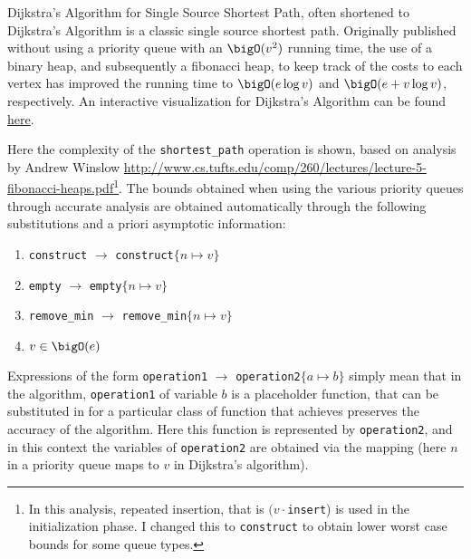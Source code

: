 Dijkstra's Algorithm for Single Source Shortest Path, often shortened to Dijkstra's Algorithm is a classic single source shortest path.  Originally published without using a priority queue with an $\bigO(v^2)$ running time, the use of a binary heap, and subsequently a fibonacci heap, to keep track of the costs to each vertex has improved the running time to $\bigO(e \log v)$ and $\bigO(e + v \log v)$, respectively.  An interactive visualization for Dijkstra's Algorithm can be found \href{http://www.cs.usfca.edu/~galles/visualization/Dijkstra.html}{here}.

\par
\bigskip

Here the complexity of the \texttt{shortest\_path} operation is shown, based on analysis by Andrew Winslow \url{http://www.cs.tufts.edu/comp/260/lectures/lecture-5-fibonacci-heaps.pdf}\footnote{In this analysis, repeated insertion, that is $(v \cdot $\texttt{insert}) is used in the initialization phase.  I changed this to \texttt{construct} to obtain lower worst case bounds for some queue types.}.  The bounds obtained when using the various priority queues through accurate analysis are obtained automatically through the following substitutions and a priori asymptotic information:

\begin{enumerate}[1.]

\item \texttt{construct} $\rightarrow$ \texttt{construct}$\{n \mapsto v\}$
\item \texttt{empty} $\rightarrow$ \texttt{empty}$\{n \mapsto v\}$
\item \texttt{remove\_min} $\rightarrow$ \texttt{remove\_min}$\{n \mapsto v\}$
\item $v \in \bigO(e)$

\end{enumerate}

Expressions of the form \texttt{operation1} $\rightarrow$ \texttt{operation2}$\{a \mapsto b\}$ simply mean that in the algorithm, \texttt{operation1} of variable $b$ is a placeholder function, that can be substituted in for a particular class of function that achieves preserves the accuracy of the algorithm.  Here this function is represented by \texttt{operation2}, and in this context the variables of \texttt{operation2} are obtained via the mapping (here $n$ in a priority queue maps to $v$ in Dijkstra's algorithm).

